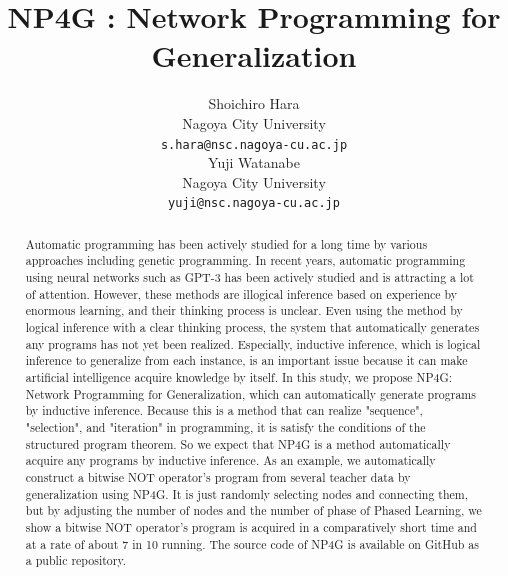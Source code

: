 \documentclass{article}
\title{NP4G : Network Programming for Generalization
}
\author{
  Shoichiro Hara \\
  Nagoya City University \\
  \texttt{s.hara@nsc.nagoya-cu.ac.jp} \\
   \And
  Yuji Watanabe \\
  Nagoya City University \\
  \texttt{yuji@nsc.nagoya-cu.ac.jp} \\
}
\begin{document}
\maketitle


\begin{abstract}
 Automatic programming has been actively studied for a long time by various approaches including genetic programming. In recent years, automatic programming using neural networks such as GPT-3 has been actively studied and is attracting a lot of attention. However, these methods are illogical inference based on experience by enormous learning, and their thinking process is unclear. Even using the method by logical inference with a clear thinking process, the system that automatically generates any programs has not yet been realized. Especially, inductive inference, which is logical inference to generalize from each instance, is an important issue because it can make artificial intelligence acquire knowledge by itself.
 In this study, we propose NP4G: Network Programming for Generalization, which can automatically generate programs by inductive inference. Because this is a method that can realize "sequence", "selection", and "iteration" in programming, it is satisfy the conditions of the structured program theorem. So we expect that NP4G is a method automatically acquire any programs by inductive inference.
 As an example, we automatically construct a bitwise NOT operator's program from several teacher data by generalization using NP4G. It is just randomly selecting nodes and connecting them, but by adjusting the number of nodes and the number of phase of Phased Learning, we show a bitwise NOT operator's program is acquired in a comparatively short time and at a rate of about 7 in 10 running.
 The source code of NP4G is available on GitHub as a public repository\footnotemark[1].
\end{abstract}



\end{document}

